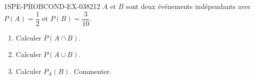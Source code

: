 \begin{exercice}{1SPE-PROBCOND-EX-038}{2}{12}
$A$ et $B$ sont deux événements indépendants avec $P(A) = \dfrac{1}{2}$ et $P(B) = \dfrac{3}{10}$.

\begin{enumerate}
  \item Calculer $P(A \cap B)$.
  \item Calculer $P(A \cup B)$.
  \item Calculer $P_A(B)$. Commenter.
\end{enumerate}
\end{exercice}
